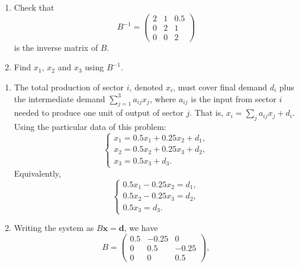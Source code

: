 \documentclass[11pt]{exam}
\begin{document}
\begin{questions}
\begin{enumerate}[leftmargin = 0.5cm, label = (\alph*), rightmargin = 0.2cm]
    \item Check that
    \[
        B^{-1} =
        \begin{pmatrix}
            2 & 1 & 0.5 \\
            0 & 2 & 1 \\
            0 & 0 & 2
        \end{pmatrix}
    \]
    is the inverse matrix of $B$.

    \item Find $x_1$, $x_2$ and $x_3$ using $B^{-1}$.

\end{enumerate}

    
\begin{solution}
\begin{enumerate}[leftmargin=0.55cm, label=(\alph*), rightmargin=0.2cm]

\item The total production of sector $i$, denoted $x_i$, must cover final demand $d_i$ plus the intermediate demand $\sum_{j=1}^3 a_{ij}x_j$, where $a_{ij}$ is the input from sector $i$ needed to produce one unit of output of sector $j$. That is,  $x_i = \sum_j a_{ij}x_j + d_i$. Using the particular data of this problem:
\[
\begin{cases}
x_1 = 0.5x_1 + 0.25x_2 + d_1,\\[2pt]
x_2 = 0.5x_2 + 0.25x_3 + d_2,\\[2pt]
x_3 = 0.5x_3 + d_3.
\end{cases}
\]
Equivalently,
\[
\begin{cases}
0.5x_1 - 0.25x_2 = d_1,\\[2pt]
0.5x_2 - 0.25x_3 = d_2,\\[2pt]
0.5x_3 = d_3.
\end{cases}
\]

\item Writing the system as $B\mathbf{x} = \mathbf{d}$, we have
\[
B = 
\begin{pmatrix}
0.5 & -0.25 & 0 \\
0   & 0.5   & -0.25 \\
0   & 0     & 0.5
\end{pmatrix},
\]


\end{enumerate}
\end{solution}
\end{questions}
\end{document}
